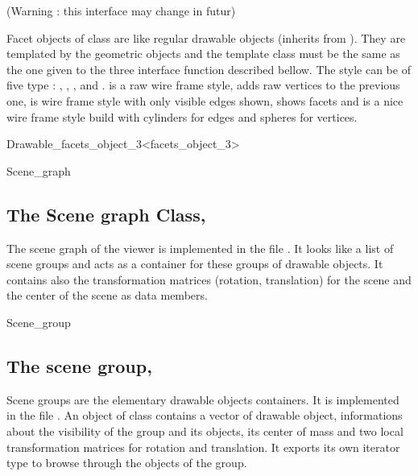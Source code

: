 
(Warning : this interface may change in futur)

Facet objects of class  are like regular
drawable objects (inherits from ). They are templated by
the geometric objects and the template class must be the same as the
one given to the three interface function described bellow. The style
can be of five type : , , ,  and .  is a raw
wire frame style,  adds raw vertices to the previous one,  is
wire frame style with only visible edges shown,  shows facets and
 is a nice wire frame style build with cylinders for edges and
spheres for vertices. 

\begin{ccClassTemplate}{Drawable_facets_object_3<facets_object_3>}
\end{ccClassTemplate}

\begin{ccClass}{Scene_graph}
\subsection{The Scene graph Class, \protect \ccClassTemplateName}

The scene graph of the viewer is implemented in the file
. It looks like a list of scene groups and acts as a
container for these groups of drawable objects. It contains also the
transformation matrices (rotation, translation) for the scene and the
center of the scene as data members.


\end{ccClass}
\begin{ccClass}{Scene_group}
\subsection{The scene group, \protect \ccClassTemplateName}

Scene groups are the elementary drawable objects containers. It is
implemented in the file . An object of class
 contains a vector of drawable object, informations about the
visibility of the group and its objects, its center of mass and two
local transformation matrices for rotation and translation. It exports 
its own iterator type to browse through the objects of the group.


\end{ccClass}

